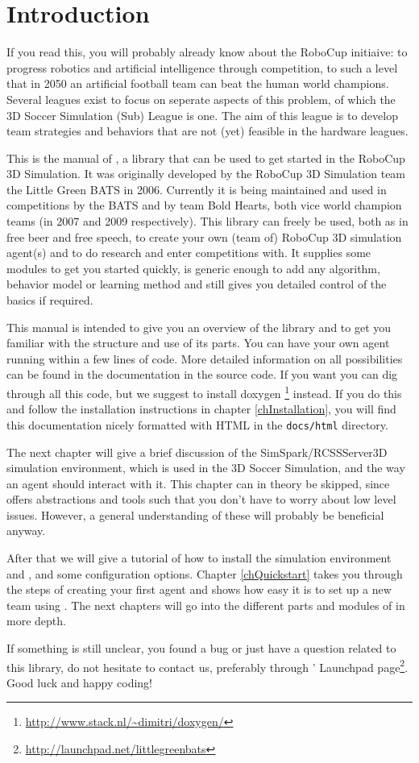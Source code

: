 \chapter{Introduction}

If you read this, you will probably already know about the RoboCup
initiaive: to progress robotics and artificial intelligence through
competition, to such a level that in 2050 an artificial football team
can beat the human world champions. Several leagues exist to focus on
seperate aspects of this problem, of which the 3D Soccer Simulation
(Sub) League is one. The aim of this league is to develop team
strategies and behaviors that are not (yet) feasible in the hardware
leagues.

This is the manual of \libbats, a library that can be used to get
started in the RoboCup 3D Simulation. It was originally developed by
the RoboCup 3D Simulation team the Little Green BATS in
2006. Currently it is being maintained and used in competitions by the
BATS and by team Bold Hearts, both vice world champion teams (in 2007
and 2009 respectively). This library can freely be used, both as in
free beer and free speech, to create your own (team of) RoboCup 3D
simulation agent(s) and to do research and enter competitions with. It
supplies some modules to get you started quickly, is generic enough to
add any algorithm, behavior model or learning method and still gives
you detailed control of the basics if required.

This manual is intended to give you an overview of the library and to
get you familiar with the structure and use of its parts. You can have
your own agent running within a few lines of code. More detailed
information on all possibilities can be found in the documentation in
the source code. If you want you can dig through all this code, but we
suggest to install doxygen
\footnote{\url{http://www.stack.nl/~dimitri/doxygen/}} instead. If you
do this and follow the installation instructions in chapter
\ref{chInstallation}, you will find this documentation nicely
formatted with HTML in the {\tt docs/html} directory.

The next chapter will give a brief discussion of the
SimSpark/RCSSServer3D simulation environment, which is used in the 3D
Soccer Simulation, and the way an agent should interact with it. This
chapter can in theory be skipped, since \libbats offers abstractions
and tools such that you don't have to worry about low level
issues. However, a general understanding of these will probably be
beneficial anyway.

After that we will give a tutorial of how to install the simulation
environment and \libbats, and some configuration options. Chapter
\ref{chQuickstart} takes you through the steps of creating your first
agent and shows how easy it is to set up a new team using
\libbats. The next chapters will go into the different parts and
modules of \libbats in more depth.

If something is still unclear, you found a bug or just have a question
related to this library, do not hesitate to contact us, preferably
through \libbats' Launchpad
page\footnote{\url{http://launchpad.net/littlegreenbats}}. Good luck
and happy coding!
